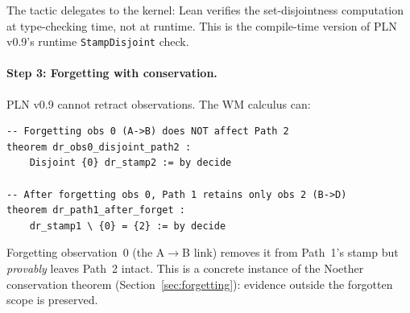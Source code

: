 \documentclass[11pt,openany]{report}
\begin{document}
\noindent
The  tactic delegates to the kernel: Lean verifies the
set-disjointness computation at type-checking time, not at runtime.
This is the compile-time version of PLN v0.9's runtime
\texttt{StampDisjoint} check.

\paragraph{Step 3: Forgetting with conservation.}
PLN v0.9 cannot retract observations.  The WM calculus can:

\begin{lstlisting}
-- Forgetting obs 0 (A->B) does NOT affect Path 2
theorem dr_obs0_disjoint_path2 :
    Disjoint {0} dr_stamp2 := by decide

-- After forgetting obs 0, Path 1 retains only obs 2 (B->D)
theorem dr_path1_after_forget :
    dr_stamp1 \ {0} = {2} := by decide
\end{lstlisting}

\noindent
Forgetting observation~0 (the A$\to$B link) removes it from Path~1's stamp
but \emph{provably} leaves Path~2 intact.  This is a concrete instance of
the Noether conservation theorem (Section~\ref{sec:forgetting}): evidence
outside the forgotten scope is preserved.
\end{document}
